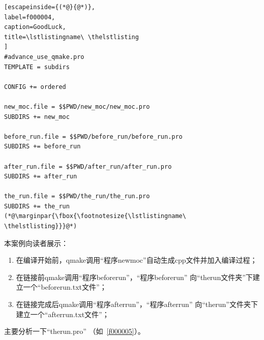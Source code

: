 \FloatBarrier
\begin{lstlisting}[escapeinside={(*@}{@*)},
label=f000004,
caption=GoodLuck,
title=\lstlistingname\ \thelstlisting
]
#advance_use_qmake.pro
TEMPLATE = subdirs

CONFIG += ordered

new_moc.file = $$PWD/new_moc/new_moc.pro
SUBDIRS += new_moc

before_run.file = $$PWD/before_run/before_run.pro
SUBDIRS += before_run

after_run.file = $$PWD/after_run/after_run.pro
SUBDIRS += after_run

the_run.file = $$PWD/the_run/the_run.pro
SUBDIRS += the_run
(*@\marginpar{\fbox{\footnotesize{\lstlistingname\ \thelstlisting}}}@*)\end{lstlisting}          %

本案例向读者展示：
\begin{enumerate}
\item 在编译开始前，qmake调用“程序new\underline{\hspace{0.5em}}moc”自动生成cpp文件并加入编译过程；
\item 在链接前qmake调用“程序before\underline{\hspace{0.5em}}run”，“程序before\underline{\hspace{0.5em}}run”
向“the\underline{\hspace{0.5em}}run文件夹”下建立一个“before\underline{\hspace{0.5em}}run.txt文件”；
\item 在链接完成后qmake调用“程序after\underline{\hspace{0.5em}}run”，“程序after\underline{\hspace{0.5em}}run”
向“the\underline{\hspace{0.5em}}run”文件夹下建立一个“after\underline{\hspace{0.5em}}run.txt文件”；
\end{enumerate}

主要分析一下“the\underline{\hspace{0.5em}}run.pro”
（如\lstlistingname\ \ref{f000005}）。


